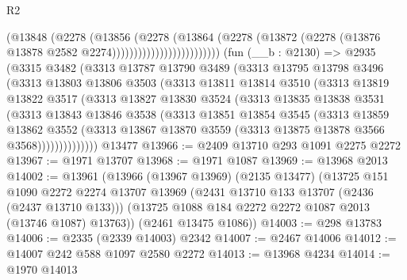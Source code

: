 \begin{lexlean}{R2}
\begin{coremodule}
                                    (@13848
                                      (@2278
                                        (@13856
                                          (@2278
                                            (@13864
                                              (@2278
                                                (@13872
                                                  (@2278
                                                    (@13876
                                                      @13878
                                                      @2582
                                                      @2274)))))))))))))))))))))))))
    (fun (__b : @2130) =>
    @2935
      (@3315
        @3482
        (@3313
          @13787
          @13790
          @3489
          (@3313
            @13795
            @13798
            @3496
            (@3313
              @13803
              @13806
              @3503
              (@3313
                @13811
                @13814
                @3510
                (@3313
                  @13819
                  @13822
                  @3517
                  (@3313
                    @13827
                    @13830
                    @3524
                    (@3313
                      @13835
                      @13838
                      @3531
                      (@3313
                        @13843
                        @13846
                        @3538
                        (@3313
                          @13851
                          @13854
                          @3545
                          (@3313
                            @13859
                            @13862
                            @3552
                            (@3313
                              @13867
                              @13870
                              @3559
                              (@3313 @13875 @13878 @3566 @3568))))))))))))))
    @13477
@13966 := @2409 @13710 @293 @1091 @2275 @2272
@13967 := @1971 @13707
@13968 := @1971 @1087
@13969 := @13968 @2013
@14002 := @13961
    (@13966
      (@13967 @13969)
      (@2135 @13477)
      (@13725
        @151
        @1090
        @2272
        @2274
        @13707
        @13969
        (@2431 @13710 @133 @13707 (@2436 (@2437 @13710 @133)))
        (@13725 @1088 @184 @2272 @2272 @1087 @2013 (@13746 @1087) @13763))
      (@2461 @13475 @1086))
@14003 := @298 @13783
@14006 := @2335 (@2339 @14003) @2342
@14007 := @2467 @14006
@14012 := @14007 @242 @588 @1097 @2580 @2272
@14013 := @13968 @4234
@14014 := @1970 @14013

\end{coremodule}
\end{lexlean}
